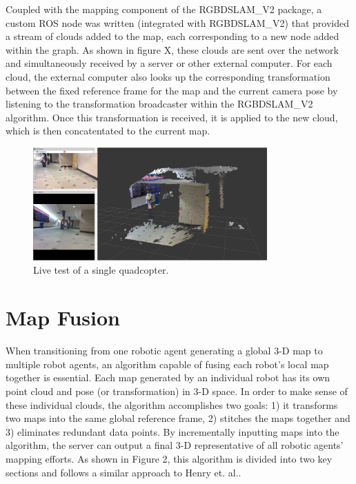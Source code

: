 \documentclass[letterpaper, oneside, 10pt]{report}
\begin{document}
Coupled with the mapping component of the RGBDSLAM_V2 package, a custom ROS node was written (integrated with RGBDSLAM_V2) that provided a stream of clouds added to the map, each corresponding to a new node added within the graph. As shown in figure X, these clouds are sent over the network and simultaneously received by a server or other external computer. For each cloud, the external computer also looks up the corresponding transformation between the fixed reference frame for the map and the current camera pose by listening to the transformation broadcaster within the RGBDSLAM_V2 algorithm. Once this transformation is received, it is applied to the new cloud, which is then concatentated to the current map.

\begin{figure}[h]
 \caption{Live test of a single quadcopter.}
 \centering
   \includegraphics[width=0.8\textwidth]{images/single_test}
\end{figure}

\section{Map Fusion}
\noindent When transitioning from one robotic agent generating a global 3-D map to multiple robot agents, an algorithm capable of fusing each robot's local map together is essential. Each map generated by an individual robot has its own point cloud and pose (or transformation) in 3-D space. In order to make sense of these individual clouds, the algorithm accomplishes two goals: 1) it transforms two maps into the same global reference frame, 2) stitches the maps together and 3) eliminates redundant data points. By incrementally inputting maps into the algorithm, the server can output a final 3-D representative of all robotic agents' mapping efforts. As shown in Figure 2, this algorithm is divided into two key sections and follows a similar approach to Henry et. al.\cite{henry2012rgb}.
\end{document}
